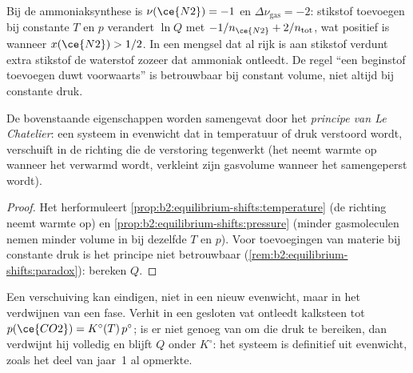 \begin{remark}\label{rem:b2:equilibrium-shifts:paradox}
Bij de ammoniaksynthese is $\nu(\ce{N2}) = -1$ en $\Delta\nu_{\text{gas}} = -2$:
stikstof toevoegen bij constante $T$ en $p$ verandert $\ln Q$ met $-1/n_{\ce{N2}} +
2/n_{\text{tot}}$, wat positief is wanneer $x(\ce{N2}) > 1/2$. In een mengsel
dat al rijk is aan stikstof verdunt extra stikstof de waterstof zozeer
dat ammoniak ontleedt. De regel ``een beginstof toevoegen duwt voorwaarts'' is betrouwbaar
bij constant volume, niet altijd bij constante druk.
\end{remark}

\begin{proposition}\label{prop:b2:equilibrium-shifts:le-chatelier}
De bovenstaande eigenschappen worden samengevat door het \emph{principe van Le
Chatelier}: een systeem in evenwicht
dat in temperatuur of druk verstoord wordt, verschuift in de richting die
de verstoring tegenwerkt (het neemt warmte op wanneer het verwarmd wordt, verkleint zijn gasvolume wanneer het
samengeperst wordt).
\end{proposition}

\begin{proof}
Het herformuleert \cref{prop:b2:equilibrium-shifts:temperature} (de 
richting neemt warmte op) en \cref{prop:b2:equilibrium-shifts:pressure} (minder
gasmoleculen nemen minder volume in bij dezelfde $T$ en $p$). Voor toevoegingen van
materie bij constante druk is het principe niet betrouwbaar
(\cref{rem:b2:equilibrium-shifts:paradox}): bereken $Q$.
\end{proof}

\begin{remark}\label{rem:b2:equilibrium-shifts:rupture}
Een verschuiving kan eindigen, niet in een nieuw evenwicht, maar in het verdwijnen van een fase.
Verhit in een gesloten vat ontleedt kalksteen tot $p(\ce{CO2}) =
K^\circ(T)\,p^\circ$; is er niet genoeg van om die druk te bereiken, dan
verdwijnt hij volledig en blijft $Q$ onder $K^\circ$: het systeem is definitief uit
evenwicht, zoals het deel van jaar~1 al opmerkte.
\end{remark}

